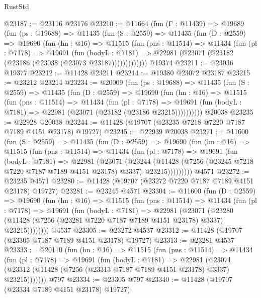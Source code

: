 \begin{lexlean}{RustStd}
\begin{coremodule}
@23187 := @23116 @23176
@23210 := @11664
    (fun (Γ : @11439) =>
    @19689
      (fun (ps : @19688) =>
      @11435
        (fun (S : @2559) =>
        @11435
          (fun (D : @2559) =>
          @19690
            (fun (hn : @16) =>
            @11515
              (fun (pns : @11514) =>
              @11434
                (fun (pl : @7178) =>
                @19691
                  (fun (bodyL : @7181) =>
                  @22981 (@23071 (@23182 (@23186 (@23038 (@23073 @23187)))))))))))))
    @19374
@23211 := @23036 @19377
@23212 := @11428 @23211
@23214 := @19380 @23072 @23187
@23215 := @23212 @23214
@23234 := @20009
    (fun (ps : @19688) =>
    @11435
      (fun (S : @2559) =>
      @11435
        (fun (D : @2559) =>
        @19690
          (fun (hn : @16) =>
          @11515
            (fun (pns : @11514) =>
            @11434
              (fun (pl : @7178) =>
              @19691 (fun (bodyL : @7181) => @22981 (@23071 (@23182 (@23186 @23215))))))))))
    @20038
@23235 := @22928 @20038
@23244 := @11428 (@19707 (@23235 @7218 @7220 @7187 @7189 @4151 @23178) @19727)
@23245 := @22939 @20038
@23271 := @11600
    (fun (S : @2559) =>
    @11435
      (fun (D : @2559) =>
      @19690
        (fun (hn : @16) =>
        @11515
          (fun (pns : @11514) =>
          @11434
            (fun (pl : @7178) =>
            @19691
              (fun (bodyL : @7181) =>
              @22981
                (@23071
                  (@23244
                    (@11428
                      (@7256 (@23245 @7218 @7220 @7187 @7189 @4151 @23178) @3337)
                      @23215)))))))))
    @4571
@23272 := @23235 @4571
@23280 := @11428 (@19707 (@23272 @7220 @7187 @7189 @4151 @23178) @19727)
@23281 := @23245 @4571
@23304 := @11600
    (fun (D : @2559) =>
    @19690
      (fun (hn : @16) =>
      @11515
        (fun (pns : @11514) =>
        @11434
          (fun (pl : @7178) =>
          @19691
            (fun (bodyL : @7181) =>
            @22981
              (@23071
                (@23280 (@11428 (@7256 (@23281 @7220 @7187 @7189 @4151 @23178) @3337) @23215))))))))
    @4537
@23305 := @23272 @4537
@23312 := @11428 (@19707 (@23305 @7187 @7189 @4151 @23178) @19727)
@23313 := @23281 @4537
@23333 := @20110
    (fun (hn : @16) =>
    @11515
      (fun (pns : @11514) =>
      @11434
        (fun (pl : @7178) =>
        @19691
          (fun (bodyL : @7181) =>
          @22981
            (@23071 (@23312 (@11428 (@7256 (@23313 @7187 @7189 @4151 @23178) @3337) @23215)))))))
    @797
@23334 := @23305 @797
@23340 := @11428 (@19707 (@23334 @7189 @4151 @23178) @19727)

\end{coremodule}
\end{lexlean}

